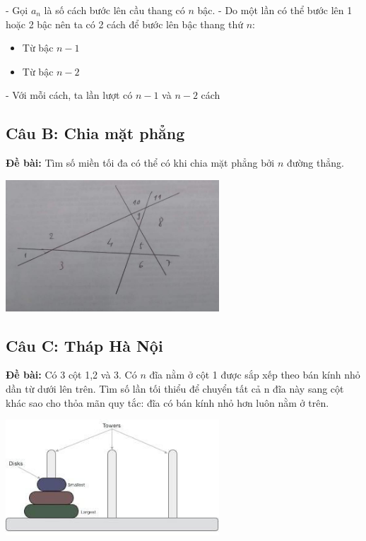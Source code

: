 \documentclass[12pt]{article}
\begin{document}
\begin{sloppypar}
- Gọi \(a_{n}\) là số cách bước lên cầu thang có \(n\) bậc.
- Do một lần có thể bước lên 1 hoặc 2 bậc nên ta có 2 cách để bước lên bậc thang thứ \(n\):

\begin{itemize}
    \item Từ bậc \(n - 1\)
    \item Từ bậc \(n - 2\)
\end{itemize}

- Với mỗi cách, ta lần lượt có \(n-1\) và \(n - 2\) cách

\subsection{Câu B: Chia mặt phẳng}
\begin{tcolorbox}
    \textbf{Đề bài:} Tìm số miền tối đa có thể có khi chia mặt phẳng bởi \(n\) đường thẳng.
\end{tcolorbox}

\begin{center}
    {\includegraphics[width=8cm]{1b.png}}
\end{center}

\subsection{Câu C: Tháp Hà Nội}
\begin{tcolorbox}
    \textbf{Đề bài:} Có 3 cột 1,2 và 3. Có \(n\) đĩa nằm ở cột 1 được sắp xếp theo bán kính nhỏ dần từ dưới lên trên. Tìm số lần tối thiểu để chuyển tất cả n đĩa này sang cột khác sao cho thỏa mãn quy tắc:  đĩa có bán kính nhỏ hơn luôn nằm ở trên.
\end{tcolorbox}

\begin{center}
    {\includegraphics[width=8cm]{toh.png}}
\end{center}


\end{sloppypar}
\end{document}
